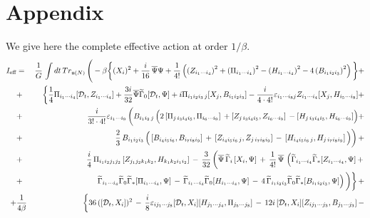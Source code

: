 \documentclass[a4paper,11pt]{article}
\begin{document}
\section{Appendix}

We give here the complete effective action at order $1/\beta$.
\begin{eqnarray*}\label{BFSS}
I_{\text{eff}} &=&\frac{1}{G}\,\int dt\,Tr_{\frak{u}(N)}\,
\Bigg(-\beta\bigg\{(X_{i})^2+\frac{i}{16}\,\overline{\Psi }\Psi+
\frac{1}{4!}\left(\left(Z_{i_{1}\cdots i_{4}}\right)^{2}+
\left(\Pi _{i_{1}\cdots i_{4}}\right)^{2}-
\left(H_{i_{1}\cdots i_{4}}\right)^{2}-
4\left( B_{i_{1}i_{2}i_{3}}\right)^{2}\right)\bigg\}+\nonumber\\
&+&\bigg\{\frac{1}{4}\Pi_{i_{1}\cdots i_{4}}[\mathcal{D}_{t},Z_{i_{1}\cdots i_{4}}]+
\frac{3i}{32}\overline{\Psi }\widetilde{\Gamma }_{0}[\mathcal{D}_{t},\Psi]+
i\Pi_{i_{1}i_{2}i_{3}\,j}[X_{j},B_{i_{1}i_{2}i_{3}}]-
\frac{i}{4\cdot4!}\varepsilon_{i_{1}\cdots i_{8} j}Z_{i_{1}\cdots i_{4}}[X_{j},H_{i_{5}\cdots i_{8}}]+\nonumber\\
&+&\frac{i}{3!\cdot 4!}\varepsilon_{i_{1}\cdots i_{9}}\,\bigg(
B_{i_{1}i_{2}\,j}\,\Big(2\,[\Pi_{j\,i_{3}i_{4}i_{5}},\Pi_{i_{6}\cdots i_{9}}]\,
+[Z_{j\,i_{3}i_{4}i_{5}},Z_{i_{6}\cdots i_{9}}]\,
-[H_{j\,i_{3}i_{4}i_{5}},H_{i_{6}\cdots i_{9}}]\Big)+\nonumber\\
&+&\frac{2}{3}\,B_{i_{1}i_{2}i_{3}}\,\Big(\,[B_{i_{4}i_{5}i_{6}},B_{i_{7}i_{8}i_{9}}]\,
+\,[Z_{i_{4}i_{5}i_{6}\,j},Z_{j\,i_{7}i_{8}i_{9}}]\,
-\,[H_{i_{4}i_{5}i_{6}\,j},H_{j\,i_{7}i_{8}i_{9}}]\,\Big)\bigg)\,+\nonumber\\
&+&\frac{i}{4}\,\Pi_{i_{1}i_{2}j_{1}j_{2}}\,[Z_{j_{1}j_{2}k_{1}k_{2}},H_{k_{1}k_{2}i_{1}i_{2}}]\,-\,
\frac{3}{32}\,\bigg( \overline{\Psi }\,\widetilde{\Gamma }_{i}\,[X_{i},\Psi ]\,+\,
\frac{1}{4!}\,\overline{\Psi }\,\left(\widetilde{\Gamma}_{i_1\cdots i_4}\widetilde{\Gamma}_{*}
[Z_{i_1\cdots i_4},\Psi ]\,+\right.\nonumber\\
&+&\left.\,\widetilde{\Gamma}_{i_1\cdots i_4}\widetilde{\Gamma}_{0}\widetilde{\Gamma}_{*}[\Pi_{i_1\cdots i_4},\Psi ]
\,-\,
\widetilde{\Gamma}_{i_1\cdots i_4}\widetilde{\Gamma}_{0}[H_{i_1\cdots i_4},\Psi ]\,-\,
4\,\widetilde{\Gamma}_{i_1 i_2 i_3}\widetilde{\Gamma}_{0}\widetilde{\Gamma}_{*}[B_{i_1 i_2 i_3},\Psi]\right)\bigg)
\bigg\}\,+ 
\nonumber \\
+&\displaystyle{\frac{1}{4 \beta}}&\,\bigg\{36\,([{\cal D}_{t},X_{i}])^{2}\,-\,
\frac{i}{8}\varepsilon_{ij_1 \cdots j_8}[{\cal D}_{t},X_{i}][H_{j_1 \cdots j_4},\Pi_{j_5 \cdots j_8}]\,-\,
12i\,[{\cal D}_{t},X_{i}][Z_{i j_1 \cdots j_3},B_{j_1 \cdots j_3}]\,-\nonumber\\

\end{eqnarray*}
\end{document}
